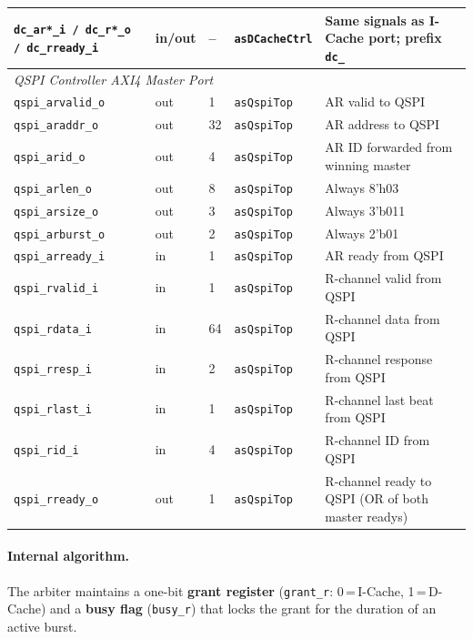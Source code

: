\begin{table}[H]
\begin{tabularx}{\textwidth}{|l |l |l |l |X|}
  \hline
  \texttt{dc\_ar*\_i / dc\_r*\_o / dc\_rready\_i} & in/out & -- & \texttt{asDCacheCtrl} & Same signals as I-Cache port; prefix \texttt{dc\_} \\
  \hline
  \multicolumn{5}{|l|}{\textit{QSPI Controller AXI4 Master Port}} \\
  \hline
  \texttt{qspi\_arvalid\_o} & out & 1  & \texttt{asQspiTop} & AR valid to QSPI \\
  \hline
  \texttt{qspi\_araddr\_o}  & out & 32 & \texttt{asQspiTop} & AR address to QSPI \\
  \hline
  \texttt{qspi\_arid\_o}    & out & 4  & \texttt{asQspiTop} & AR ID forwarded from winning master \\
  \hline
  \texttt{qspi\_arlen\_o}   & out & 8  & \texttt{asQspiTop} & Always 8'h03 \\
  \hline
  \texttt{qspi\_arsize\_o}  & out & 3  & \texttt{asQspiTop} & Always 3'b011 \\
  \hline
  \texttt{qspi\_arburst\_o} & out & 2  & \texttt{asQspiTop} & Always 2'b01 \\
  \hline
  \texttt{qspi\_arready\_i} & in  & 1  & \texttt{asQspiTop} & AR ready from QSPI \\
  \hline
  \texttt{qspi\_rvalid\_i}  & in  & 1  & \texttt{asQspiTop} & R-channel valid from QSPI \\
  \hline
  \texttt{qspi\_rdata\_i}   & in  & 64 & \texttt{asQspiTop} & R-channel data from QSPI \\
  \hline
  \texttt{qspi\_rresp\_i}   & in  & 2  & \texttt{asQspiTop} & R-channel response from QSPI \\
  \hline
  \texttt{qspi\_rlast\_i}   & in  & 1  & \texttt{asQspiTop} & R-channel last beat from QSPI \\
  \hline
  \texttt{qspi\_rid\_i}     & in  & 4  & \texttt{asQspiTop} & R-channel ID from QSPI \\
  \hline
  \texttt{qspi\_rready\_o}  & out & 1  & \texttt{asQspiTop} & R-channel ready to QSPI (OR of both master readys) \\
  \hline
\end{tabularx}
\end{table}

\paragraph{Internal algorithm.}
The arbiter maintains a one-bit \textbf{grant register}
(\texttt{grant\_r}: 0\,=\,I-Cache, 1\,=\,D-Cache) and a
\textbf{busy flag} (\texttt{busy\_r}) that locks the grant for the
duration of an active burst.

